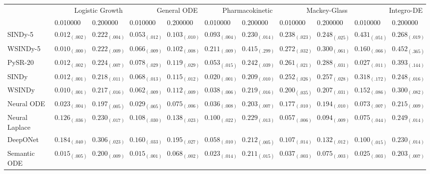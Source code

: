 \begin{tabular}{lllllllllll}
\toprule
 & \multicolumn{2}{r}{Logistic Growth} & \multicolumn{2}{r}{General ODE} & \multicolumn{2}{r}{Pharmacokinetic} & \multicolumn{2}{r}{Mackey-Glass} & \multicolumn{2}{r}{Integro-DE} \\
 & 0.010000 & 0.200000 & 0.010000 & 0.200000 & 0.010000 & 0.200000 & 0.010000 & 0.200000 & 0.010000 & 0.200000 \\
\midrule
SINDy-5 & $0.012_{(.002)}$ & $0.222_{(.004)}$ & $0.053_{(.012)}$ & $0.103_{(.010)}$ & $0.093_{(.004)}$ & $0.230_{(.014)}$ & $0.238_{(.023)}$ & $0.248_{(.025)}$ & $0.431_{(.051)}$ & $0.268_{(.019)}$ \\
WSINDy-5 & $0.010_{(.000)}$ & $0.222_{(.009)}$ & $0.066_{(.009)}$ & $0.102_{(.008)}$ & $0.211_{(.009)}$ & $0.415_{(.299)}$ & $0.272_{(.032)}$ & $0.300_{(.061)}$ & $0.160_{(.066)}$ & $0.452_{(.365)}$ \\
PySR-20 & $0.012_{(.002)}$ & $0.224_{(.007)}$ & $0.078_{(.029)}$ & $0.119_{(.029)}$ & $0.053_{(.015)}$ & $0.242_{(.039)}$ & $0.261_{(.021)}$ & $0.288_{(.031)}$ & $0.027_{(.011)}$ & $0.393_{(.144)}$ \\
SINDy & $0.012_{(.001)}$ & $0.218_{(.011)}$ & $0.068_{(.013)}$ & $0.115_{(.012)}$ & $0.020_{(.001)}$ & $0.209_{(.010)}$ & $0.252_{(.026)}$ & $0.257_{(.028)}$ & $0.318_{(.172)}$ & $0.248_{(.016)}$ \\
WSINDy & $0.010_{(.001)}$ & $0.217_{(.016)}$ & $0.062_{(.009)}$ & $0.112_{(.009)}$ & $0.038_{(.006)}$ & $0.219_{(.016)}$ & $0.200_{(.035)}$ & $0.207_{(.031)}$ & $0.152_{(.086)}$ & $0.300_{(.082)}$ \\
Neural ODE & $0.023_{(.004)}$ & $0.197_{(.005)}$ & $0.029_{(.005)}$ & $0.075_{(.006)}$ & $0.036_{(.008)}$ & $0.203_{(.007)}$ & $0.177_{(.010)}$ & $0.194_{(.010)}$ & $0.073_{(.007)}$ & $0.215_{(.009)}$ \\
Neural Laplace & $0.126_{(.036)}$ & $0.230_{(.017)}$ & $0.108_{(.030)}$ & $0.138_{(.023)}$ & $0.100_{(.022)}$ & $0.229_{(.013)}$ & $0.057_{(.006)}$ & $0.094_{(.009)}$ & $0.075_{(.044)}$ & $0.249_{(.014)}$ \\
DeepONet & $0.184_{(.040)}$ & $0.306_{(.023)}$ & $0.160_{(.033)}$ & $0.195_{(.027)}$ & $0.058_{(.010)}$ & $0.212_{(.005)}$ & $0.107_{(.014)}$ & $0.132_{(.012)}$ & $0.100_{(.015)}$ & $0.230_{(.014)}$ \\
Semantic ODE & $0.015_{(.005)}$ & $0.200_{(.009)}$ & $0.015_{(.001)}$ & $0.068_{(.002)}$ & $0.023_{(.014)}$ & $0.211_{(.015)}$ & $0.037_{(.003)}$ & $0.075_{(.003)}$ & $0.025_{(.003)}$ & $0.203_{(.007)}$ \\
\bottomrule
\end{tabular}
